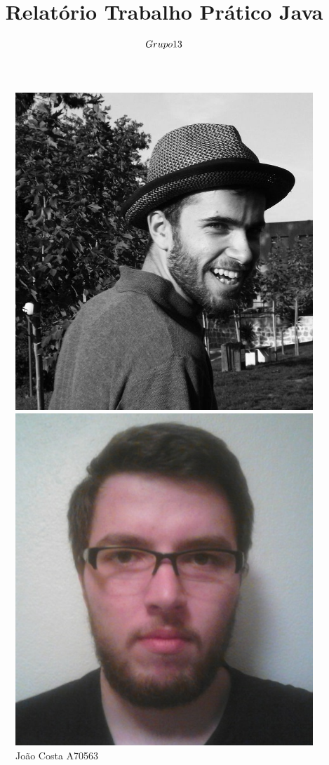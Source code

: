 \documentclass[10pt] {article}
\begin{document}
\title{Relatório Trabalho Prático Java \\ $\small{Grupo 13}$}

\maketitle

\begin{figure}[!htb]
  \includegraphics[width=\linewidth]{jc.jpg}
  \caption*{João Costa A70563}\label{fig:awesome_image1}
\endminipage\hfill
{}
  \includegraphics[width=\linewidth]{ls.jpg}

\end{figure}
\end{document}
